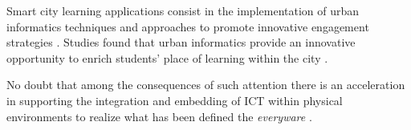 Smart city learning applications consist in the implementation of urban informatics techniques and approaches to promote innovative engagement strategies \cite{amayocaldwell_urban_2013}.
Studies found that urban informatics provide an innovative opportunity to enrich students' place of learning within the city \cite{amayocaldwell_urban_2013}.

No doubt that among the consequences of such attention there is an acceleration in supporting the integration and embedding of ICT within physical environments to realize what has been defined the \textit{everyware} \cite{giffinger_smart_2007}.


